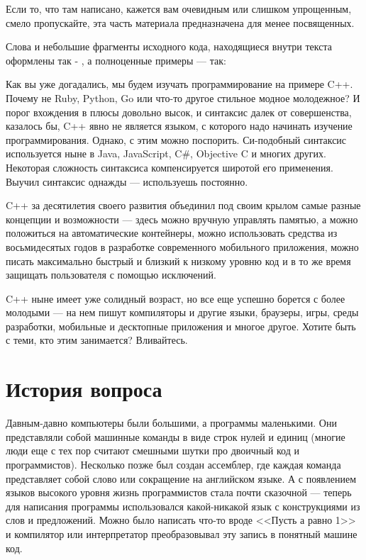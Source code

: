 \documentclass[book.tex]{subfiles}
\begin{document}
Если то, что там написано, кажется вам очевидным или слишком упрощенным, смело пропускайте, эта часть материала предназначена для менее посвященных.

Слова и небольшие фрагменты исходного кода, находящиеся внутри текста оформлены так - , а полноценные примеры --- так:


Как вы уже догадались, мы будем изучать программирование на примере C++. Почему не Ruby, Python, Go или что-то другое стильное модное молодежное? И порог вхождения в плюсы довольно высок, и синтаксис далек от совершенства, казалось бы, C++ явно не является языком, с которого надо начинать изучение программирования. Однако, с этим можно поспорить. Си-подобный синтаксис используется ныне в Java, JavaScript, C\#, Objective C и многих других. Некоторая сложность синтаксиса компенсируется широтой его применения. Выучил синтаксис однажды --- используешь постоянно.

C++ за десятилетия своего развития объединил под своим крылом самые разные концепции и возможности --- здесь можно вручную управлять памятью, а можно положиться на автоматические контейнеры, можно использовать средства из восьмидесятых годов в разработке современного мобильного приложения, можно писать максимально быстрый и близкий к низкому уровню код и в то же время защищать пользователя с помощью исключений.

C++ ныне имеет уже солидный возраст, но все еще успешно борется с более молодыми --- на нем пишут компиляторы и другие языки, браузеры, игры, среды разработки, мобильные и десктопные приложения и многое другое. Хотите быть с теми, кто этим занимается? Вливайтесь.

\section*{История вопроса}

Давным-давно компьютеры были большими, а программы маленькими. Они представляли собой машинные команды в виде строк нулей и единиц (многие люди еще с тех пор считают смешными шутки про двоичный код и программистов). Несколько позже был создан ассемблер, где каждая команда представляет собой слово или сокращение на английском языке. А с появлением языков высокого уровня жизнь программистов стала почти сказочной --- теперь для написания программы использовался какой-никакой язык с конструкциями из слов и предложений. Можно было написать что-то вроде <<Пусть а равно 1>> и компилятор или интерпретатор преобразовывал эту запись в понятный машине код.
\end{document}
